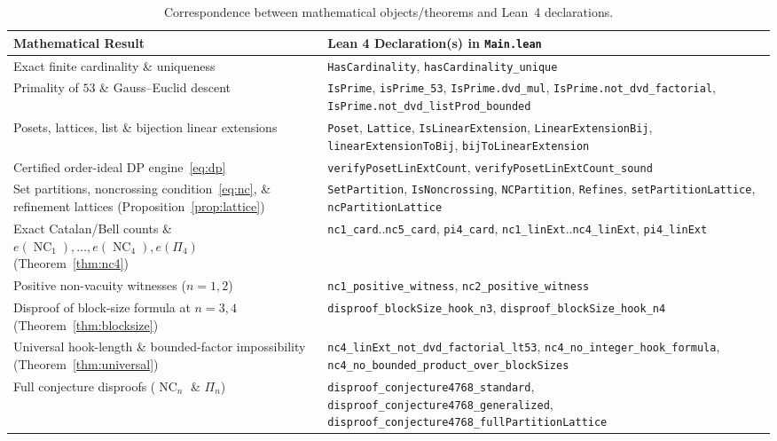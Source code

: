 \documentclass[11pt]{article}
\theoremstyle{definition}
\newcommand{\NC}{\operatorname{NC}}
\begin{document}
\begin{table}[ht]
\centering
\caption{Correspondence between mathematical objects/theorems and Lean~4 declarations.}
\label{tab:lean}
\vspace{4pt}
{\small
\begin{tabular}{@{}>{\raggedright\arraybackslash}p{}>{\raggedright\arraybackslash}p{}@{}}
\toprule
Mathematical Result & Lean 4 Declaration(s) in \texttt{Main.lean} \\
\midrule
Exact finite cardinality \& uniqueness &
  \texttt{HasCardinality}, \texttt{hasCardinality\_unique} \\
Primality of $53$ \& Gauss--Euclid descent &
  \texttt{IsPrime}, \texttt{isPrime\_53}, \texttt{IsPrime.dvd\_mul},
  \texttt{IsPrime.not\_dvd\_factorial}, \texttt{IsPrime.not\_dvd\_listProd\_bounded} \\
Posets, lattices, list \& bijection linear extensions &
  \texttt{Poset}, \texttt{Lattice}, \texttt{IsLinearExtension},
  \texttt{LinearExtensionBij}, \texttt{linearExtensionToBij},
  \texttt{bijToLinearExtension} \\
Certified order-ideal DP engine~\eqref{eq:dp} &
  \texttt{verifyPosetLinExtCount}, \texttt{verifyPosetLinExtCount\_sound} \\
Set partitions, noncrossing condition~\eqref{eq:nc}, \& refinement lattices (Proposition~\ref{prop:lattice}) &
  \texttt{SetPartition}, \texttt{IsNoncrossing}, \texttt{NCPartition},
  \texttt{Refines}, \texttt{setPartitionLattice}, \texttt{ncPartitionLattice} \\
Exact Catalan/Bell counts \& $e(\NC_1),\dots,e(\NC_4), e(\Pi_4)$ (Theorem~\ref{thm:nc4}) &
  \texttt{nc1\_card}..\texttt{nc5\_card}, \texttt{pi4\_card},
  \texttt{nc1\_linExt}..\texttt{nc4\_linExt}, \texttt{pi4\_linExt} \\
Positive non-vacuity witnesses ($n = 1, 2$) &
  \texttt{nc1\_positive\_witness}, \texttt{nc2\_positive\_witness} \\
Disproof of block-size formula at $n = 3, 4$ (Theorem~\ref{thm:blocksize}) &
  \texttt{disproof\_blockSize\_hook\_n3}, \texttt{disproof\_blockSize\_hook\_n4} \\
Universal hook-length \& bounded-factor impossibility (Theorem~\ref{thm:universal}) &
  \texttt{nc4\_linExt\_not\_dvd\_factorial\_lt53},
  \texttt{nc4\_no\_integer\_hook\_formula},
  \texttt{nc4\_no\_bounded\_product\_over\_blockSizes} \\
Full conjecture disproofs ($\NC_n$ \& $\Pi_n$) &
  \texttt{disproof\_conjecture4768\_standard},
  \texttt{disproof\_conjecture4768\_generalized},
  \texttt{disproof\_conjecture4768\_fullPartitionLattice} \\
\bottomrule
\end{tabular}}
\end{table}
\end{document}
